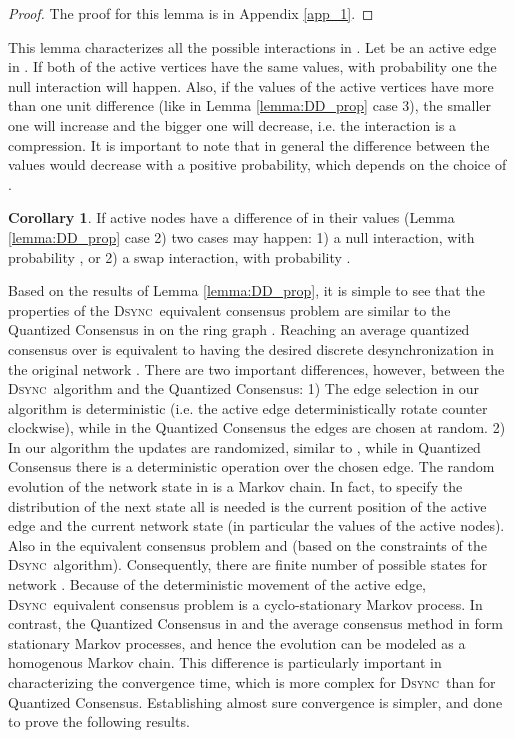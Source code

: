 \documentclass[conference]{IEEEtran}
\newcommand{\DDD}{\textsc{Dsync~}}
\theoremstyle{definition}
\theoremstyle{definition}
\newtheorem{corollary}{Corollary}
\begin{document}
\begin{proof} The proof for this lemma is in Appendix \ref{app_1}. \end{proof}
This lemma characterizes all the possible interactions in . Let  be an active edge in . If both of the active vertices have the same values, with probability one the null interaction will happen. Also, if the values of the active vertices have more than one unit difference (like in Lemma \ref{lemma:DD_prop} case 3), the smaller one will increase and the bigger one will decrease, i.e. the interaction is a compression.
It is important to note that in general the difference between the values would decrease with a positive probability, which depends on the choice of .
\begin{corollary}\label{cor.prob}
If active nodes have a difference of  in their values (Lemma \ref{lemma:DD_prop} case 2) two cases may happen: 1) a null interaction, with probability , or 2) a swap interaction, with probability . 
\end{corollary}

Based on the results of Lemma \ref{lemma:DD_prop}, it is simple to see that the properties of the \DDD equivalent consensus problem are similar to the Quantized Consensus in \cite{quant} on the ring graph . Reaching an average quantized consensus over  is equivalent to having the desired discrete desynchronization in the original network . There are two important differences, however, between the \DDD algorithm and the Quantized Consensus: 1) The edge selection in our algorithm is deterministic (i.e. the active edge deterministically rotate counter clockwise), while in the Quantized Consensus the edges are chosen at random. 2) In our algorithm the updates are randomized, similar to \cite{can}, while in Quantized Consensus there is a deterministic operation over the chosen edge. The random evolution of the network state  in  is a Markov chain. In fact, to specify the distribution of the next state  all is needed is the current position of the active edge and the current network state  (in particular the values of the active nodes). Also in the equivalent consensus problem  and  (based on the constraints of the \DDD algorithm). Consequently, there are finite number of possible states for network . Because of the deterministic movement of the active edge, \DDD equivalent consensus problem  is a cyclo-stationary Markov process. In contrast, the Quantized Consensus in \cite{quant} and the average consensus method in \cite{can} form stationary Markov processes, and hence the evolution can be modeled as a homogenous Markov chain. This difference is particularly important in characterizing the convergence time, which is more complex for \DDD than for Quantized Consensus. Establishing almost sure convergence is simpler, and done to prove the following results. 
\end{document}
